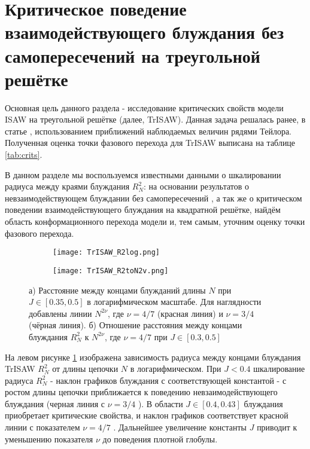 \section{Критическое поведение взаимодействующего блуждания без самопересечений на треугольной решётке}

Основная цель данного раздела - исследование критических свойств модели ISAW на треугольной решётке (далее, TrISAW).
Данная задача решалась ранее, в статье \cite{Privman1986}, использованием приближений наблюдаемых величин рядями Тейлора.
Полученная оценка точки фазового перехода для TrISAW выписана на таблице \ref{tab:crits}.

В данном разделе мы воспользуемся известными данными о шкалировании радиуса между краями блуждания $R^2_N$:
на основании результатов о невзаимодействующем блуждании без самопересечений \cite{Rensburg2015}, а так же о критическом поведении взаимодействующего блуждания \cite{Duplantier1987} на квадратной решётке,
найдём область конформационного перехода модели и, тем самым, уточним оценку точки фазового перехода.
 

\begin{figure}[h]
\begin{subfigure}{0.49\textwidth}
\texttt{[image: TrISAW\_R2log.png]}
\caption{}
\label{fig:TrISAW_R2log}
\end{subfigure}
\hfill
\begin{subfigure}{0.49\textwidth}
\texttt{[image: TrISAW\_R2toN2v.png]}
\caption{}
\label{fig:TrISAW_R2toN2v}
\end{subfigure}
\caption{а) Расстояние между концами блужданий длины $N$ при $J \in [0.35,0.5]$ в логарифмическом масштабе. 
Для наглядности добавлены линии $N^{2\nu}$, где $\nu = 4/7$ (красная линия) и $\nu=3/4$ (чёрная линия).
б) Отношение расстояния между концами блуждания $R^2_N$ к $N^{2\nu}$, где $\nu=4/7$ при $J \in [0.3,0.5]$}
\end{figure}

На левом рисунке \ref{fig:TrISAW_R2log} изображена зависимость радиуса между концами блуждания TrISAW $R^2_N$ от длины цепочки $N$ в логарифмическом.
При $J < 0.4$ шкалирование радиуса $R^2_N$ - наклон графиков блуждания с соответствующей константой - с ростом длины цепочки приближается к поведению невзаимодействующего блуждания (черная линия с $\nu = 3/4$ \cite{Rensburg2015}).
В области $J \in [0.4, 0.43]$ блуждания приобретает критические свойства, и наклон графиков соответствует красной линии с показателем $\nu=4/7$ \cite{Duplantier1987}.
Дальнейшее увеличение константы $J$ приводит к уменьшению показателя $\nu$ до поведения плотной глобулы.

